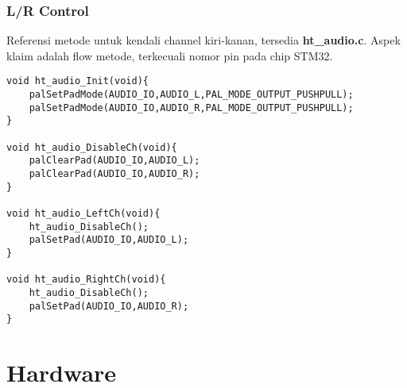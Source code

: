 \documentclass[12pt,]{article}
\begin{document}
	\subsubsection{L/R Control}
	
	Referensi metode untuk kendali channel kiri-kanan, tersedia \textbf{ht\_audio.c}.
	Aspek klaim adalah flow metode, terkecuali nomor pin pada chip STM32.
	
	\begin{verbatim}
void ht_audio_Init(void){
	palSetPadMode(AUDIO_IO,AUDIO_L,PAL_MODE_OUTPUT_PUSHPULL);
	palSetPadMode(AUDIO_IO,AUDIO_R,PAL_MODE_OUTPUT_PUSHPULL);
}
	
void ht_audio_DisableCh(void){
	palClearPad(AUDIO_IO,AUDIO_L);
	palClearPad(AUDIO_IO,AUDIO_R);
}

void ht_audio_LeftCh(void){
	ht_audio_DisableCh();
	palSetPad(AUDIO_IO,AUDIO_L);
}

void ht_audio_RightCh(void){
	ht_audio_DisableCh();
	palSetPad(AUDIO_IO,AUDIO_R);
}
	\end{verbatim}

	\newpage
	\section{Hardware}
\end{document}

